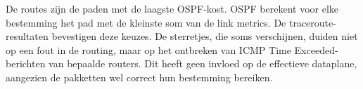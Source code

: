 De routes zijn de paden met de laagste OSPF-kost. OSPF berekent voor elke bestemming het pad met de kleinste som van de link metrics. De traceroute-resultaten bevestigen deze keuzes. De sterretjes, die soms verschijnen, duiden niet op een fout in de routing, maar op het ontbreken van ICMP Time Exceeded-berichten van bepaalde routers. Dit heeft geen invloed op de effectieve dataplane, aangezien de pakketten wel correct hun bestemming bereiken.